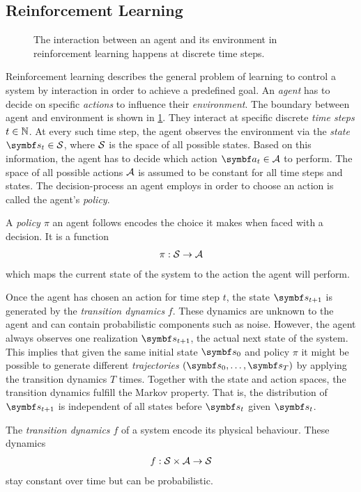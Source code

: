 \subsection{Reinforcement Learning}
\label{sub:reinforcement_learning:reinforcement_learning}
\begin{figure}[t]
    \centering
    
    \caption[Agent-environment interaction]{
        The interaction between an agent and its environment in reinforcement learning happens at discrete time steps.
    }
    \label{fig:reinforcement_learning:agent_environment_interaction}
\end{figure}
Reinforcement learning describes the general problem of learning to control a system by interaction in order to achieve a predefined goal.
An \emph{agent} has to decide on specific \emph{actions} to influence their \emph{environment}.
The boundary between agent and environment is shown in \cref{fig:reinforcement_learning:agent_environment_interaction}.
They interact at specific discrete \emph{time steps} $t \in \mathbb{N}$.
At every such time step, the agent observes the environment via the \emph{state} $\mat{s}_t \in \Sc$, where $\mathcal{S}$ is the space of all possible states.
Based on this information, the agent has to decide which action $\mat{a}_t \in \Ac$ to perform.
The space of all possible actions $\mathcal{A}$ is assumed to be constant for all time steps and states.
The decision-process an agent employs in order to choose an action is called the agent's \emph{policy}.

\begin{definition}[Policy]
    A \emph{policy $\pi$} an agent follows encodes the choice it makes when faced with a decision.
    It is a function
    \begin{align}
        \pi: \mathcal{S} \to \mathcal{A}
    \end{align}
    which maps the current state of the system to the action the agent will perform.
\end{definition}

Once the agent has chosen an action for time step $t$, the state $\mat{s}_{t+1}$ is generated by the \emph{transition dynamics} $f$.
These dynamics are unknown to the agent and can contain probabilistic components such as noise.
However, the agent always observes one realization $\mat{s}_{t+1}$, the actual next state of the system.
This implies that given the same initial state $\mat{s}_0$ and policy $\pi$ it might be possible to generate different \emph{trajectories} $(\mat{s}_0, \dots, \mat{s}_T)$ by applying the transition dynamics $T$ times.
Together with the state and action spaces, the transition dynamics fulfill the Markov property.
That is, the distribution of $\mat{s}_{t+1}$ is independent of all states before $\mat{s}_t$ given $\mat{s}_t$.
\begin{definition}
    \label{def:reinforcement_learning:transition_dynamics}
    The \emph{transition dynamics $f$} of a system encode its physical behaviour.
    These dynamics
    \begin{align}
        f: \mathcal{S} \times \mathcal{A} \to \mathcal{S}
    \end{align}
    stay constant over time but can be probabilistic.
\end{definition}

